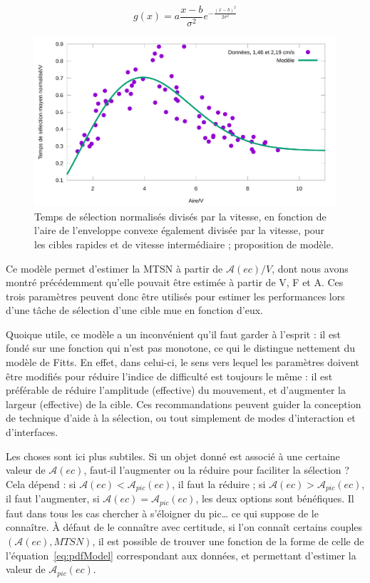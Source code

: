 	\begin{equation}
		g(x) = a\frac{x-b}{\sigma^{2}}e^{-\frac{(x-b)^{2}}{2\sigma^{2}} }
		\label{eq:pdfModel}
	\end{equation}
	
	\begin{figure}[!htb]
		\centering
		\includegraphics[width=\textwidth]{figures/ch4/timeVareaFit}
		\caption[Temps de sélection/V en fonction de $\mathcal{A}(ec)/V$ et modèle]{Temps de sélection normalisés divisés par la vitesse, en fonction de l'aire de l'enveloppe convexe également divisée par la vitesse, pour les cibles rapides et de vitesse intermédiaire ; proposition de modèle.}
		\label{fig:timeVareaFit}
	\end{figure}
	
	Ce modèle permet d'estimer la MTSN à partir de $\mathcal{A}(ec)/V$, dont nous avons montré précédemment qu'elle pouvait être estimée à partir de V, F et A. Ces trois paramètres peuvent donc être utilisés pour estimer les performances lors d'une tâche de sélection d'une cible mue en fonction d'eux.
	
	Quoique utile, ce modèle a un inconvénient qu'il faut garder à l'esprit : il est fondé sur une fonction qui n'est pas monotone, ce qui le distingue nettement du modèle de Fitts. En effet, dans celui-ci, le sens vers lequel les paramètres doivent être modifiés pour réduire l'indice de difficulté est toujours le même : il est préférable de réduire l'amplitude (effective) du mouvement, et d'augmenter la largeur (effective) de la cible. Ces recommandations peuvent guider la conception de technique d'aide à la sélection, ou tout simplement de modes d'interaction et d'interfaces.
	
	Les choses sont ici plus subtiles. Si un objet donné est associé à une certaine valeur de $\mathcal{A}(ec)$, faut-il l'augmenter ou la réduire pour faciliter la sélection ? Cela dépend : si $\mathcal{A}(ec) < \mathcal{A}_{pic}(ec)$, il faut la réduire ; si $\mathcal{A}(ec) > \mathcal{A}_{pic}(ec)$, il faut l'augmenter, si $\mathcal{A}(ec) = \mathcal{A}_{pic}(ec)$, les deux options sont bénéfiques. Il faut dans tous les cas chercher à \og s'éloigner \fg{} du pic\ldots{} ce qui suppose de le connaître. À défaut de le connaître avec certitude, si l'on connaît certains couples $\left( \mathcal{A}(ec), MTSN\right)$, il est possible de trouver une fonction de la forme de celle de l'équation~\ref{eq:pdfModel} correspondant aux données, et permettant d'estimer la valeur de $\mathcal{A}_{pic}(ec)$.
	
